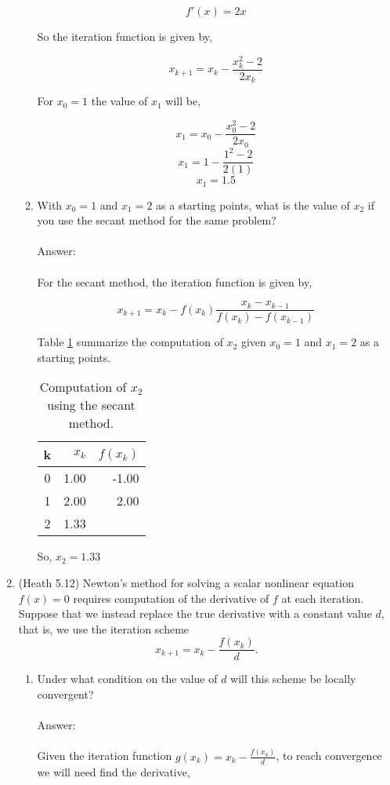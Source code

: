 \documentclass{article}
\begin{document}
\begin{enumerate}
\begin{enumerate}
$$f'(x)=2x$$

So the iteration function is given by,

$$x_{k+1}=x_k-\frac{x_k^2-2}{2x_k}$$

For $x_0=1$ the value of $x_1$ will be,

$$x_{1}=x_0-\frac{x_0^2-2}{2x_0}$$
$$x_{1}=1-\frac{1^2-2}{2(1)}$$
$$x_{1}=1.5$$
\item With $x_0 = 1$ and $x_1 = 2$ as a starting points, what is the value of $x_2$ if you use the secant method for the same problem?
\\
\\
Answer:\\
\\
For the secant method, the iteration function is given by,

$$x_{k+1}=x_k-f(x_k)\frac{x_k-x_{k-1}}{f(x_k)-f(x_{k-1})}$$

Table \ref{tab:q7a} summarize the computation of $x_2$ given $x_0 = 1$ and $x_1 = 2$ as a starting points.

\begin{table}[h]
 \centering
 \begin{center}
\begin{tabular}{crr}
\toprule
k & $x_k$ & $f(x_k)$\\
\midrule
0 & 1.00 & -1.00\\
1 & 2.00 &  2.00\\
2 & 1.33 & \\
\bottomrule
 \end{tabular}
 \end{center}
 \caption{Computation of $x_2$ using the secant method.}
 \label{tab:q7a}
\end{table}

So, $x_2=1.33$
 
\end{enumerate}

\item (Heath 5.12) Newton's method for solving a scalar nonlinear equation $f(x) = 0$ requires computation of the derivative of $f$ at each iteration.  Suppose that we instead replace
  the true derivative with a constant value $d$, that is, we use the iteration scheme
$$
x_{k+1} = x_k - \frac{f(x_k)}{d}.
$$
\begin{enumerate}
\item Under what condition on the value of $d$ will this scheme be locally convergent?
\\
\\
Answer:\\
\\
Given the iteration function $g(x_k)=x_k-\frac{f(x_k)}{d}$, to reach convergence we will need find the derivative,


\end{enumerate}
\end{enumerate}
\end{document}
